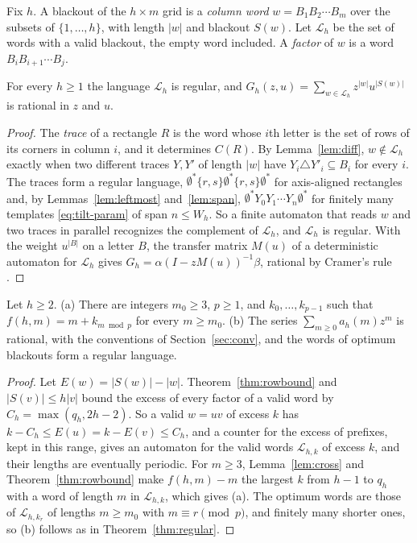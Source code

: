 Fix $h$. A blackout of the $h\times m$ grid is a \emph{column word} $w=B_1B_2\cdots B_m$ over the subsets of $\{1,\dots,h\}$, with length $|w|$ and blackout $S(w)$. Let $\mathcal L_h$ be the set of words with a valid blackout, the empty word included. A \emph{factor} of $w$ is a word $B_iB_{i+1}\cdots B_j$.

\begin{theorem}\label{thm:regular}
For every $h\ge1$ the language $\mathcal L_h$ is regular, and $G_h(z,u)=\sum_{w\in\mathcal L_h}z^{|w|}u^{|S(w)|}$ is rational in $z$ and $u$.
\end{theorem}

\begin{proof}
The \emph{trace} of a rectangle $R$ is the word whose $i$th letter is the set of rows of its corners in column $i$, and it determines $C(R)$. By Lemma~\ref{lem:diff}, $w\notin\mathcal L_h$ exactly when two different traces $Y,Y'$ of length $|w|$ have $Y_i\triangle Y'_i\subseteq B_i$ for every $i$. The traces form a regular language, $\emptyset^*\{r,s\}\emptyset^*\{r,s\}\emptyset^*$ for axis-aligned rectangles and, by Lemmas~\ref{lem:leftmost} and~\ref{lem:span}, $\emptyset^*Y_0Y_1\cdots Y_n\emptyset^*$ for finitely many templates \eqref{eq:tilt-param} of span $n\le W_h$. So a finite automaton that reads $w$ and two traces in parallel recognizes the complement of $\mathcal L_h$, and $\mathcal L_h$ is regular. With the weight $u^{|B|}$ on a letter $B$, the transfer matrix $M(u)$ of a deterministic automaton for $\mathcal L_h$ gives $G_h=\alpha(I-zM(u))^{-1}\beta$, rational by Cramer's rule \cite[Proposition~V.6]{flajolet2009}.
\end{proof}

\begin{theorem}\label{thm:periodic}
Let $h\ge2$. (a) There are integers $m_0\ge3$, $p\ge1$, and $k_0,\dots,k_{p-1}$ such that $f(h,m)=m+k_{m\bmod p}$ for every $m\ge m_0$. (b) The series $\sum_{m\ge0}a_h(m)z^m$ is rational, with the conventions of Section~\ref{sec:conv}, and the words of optimum blackouts form a regular language.
\end{theorem}

\begin{proof}
Let $E(w)=|S(w)|-|w|$. Theorem~\ref{thm:rowbound} and $|S(v)|\le h|v|$ bound the excess of every factor of a valid word by $C_h=\max(q_h,2h-2)$. So a valid $w=uv$ of excess $k$ has $k-C_h\le E(u)=k-E(v)\le C_h$, and a counter for the excess of prefixes, kept in this range, gives an automaton for the valid words $\mathcal L_{h,k}$ of excess $k$, and their lengths are eventually periodic. For $m\ge3$, Lemma~\ref{lem:cross} and Theorem~\ref{thm:rowbound} make $f(h,m)-m$ the largest $k$ from $h-1$ to $q_h$ with a word of length $m$ in $\mathcal L_{h,k}$, which gives (a). The optimum words are those of $\mathcal L_{h,k_r}$ of lengths $m\ge m_0$ with $m\equiv r\pmod p$, and finitely many shorter ones, so (b) follows as in Theorem~\ref{thm:regular}.
\end{proof}
